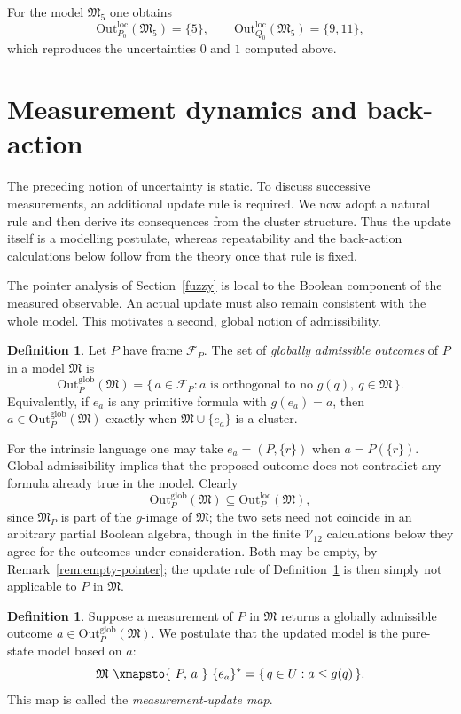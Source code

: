 \documentclass{article}   	%
\theoremstyle{plain}
\theoremstyle{definition}
\newtheorem{definition}[theorem]{Definition}
\theoremstyle{remark}
\newcommand{\Outloc}[2]{\mathrm{Out}^{\mathrm{loc}}_{#1}(#2)}
\newcommand{\Outglob}[2]{\mathrm{Out}^{\mathrm{glob}}_{#1}(#2)}
\begin{document}
For the model $\mathfrak M_5$ one obtains
\[
\Outloc{{P_0}}{\mathfrak M_5}=\{5\},
\qquad
\Outloc{{Q_0}}{\mathfrak M_5}=\{9,11\},
\]
which reproduces the uncertainties $0$ and $1$ computed above.


\section{Measurement dynamics and back-action}
\label{sec:dynamics}

The preceding notion of uncertainty is static.  To discuss successive
measurements, an additional update rule is required.  We now adopt a natural
rule and then derive its consequences from the cluster structure.  Thus the
update itself is a modelling postulate, whereas repeatability and the
back-action calculations below follow from the theory once that rule is fixed.

The pointer analysis of Section~\ref{fuzzy} is local to the Boolean component
of the measured observable.  An actual update must also remain consistent with
the whole model.  This motivates a second, global notion of admissibility.

\begin{definition}
\label{def:global-outcomes}
Let $P$ have frame $\mathcal F_P$.  The set of \emph{globally admissible
outcomes} of $P$ in a model $\mathfrak M$ is
\[
\Outglob{P}{\mathfrak M}
 =\{\,a\in\mathcal F_P:
      a\text{ is orthogonal to no }g(q),\ q\in\mathfrak M\,\}.
\]
Equivalently, if $e_a$ is any primitive formula with $g(e_a)=a$, then
$a\in\Outglob{P}{\mathfrak M}$ exactly when
$\mathfrak M\cup\{e_a\}$ is a cluster.
\end{definition}

For the intrinsic language one may take $e_a=(P,\{r\})$ when
$a=P(\{r\})$.  Global admissibility implies that the proposed outcome does not
contradict any formula already true in the model.  Clearly
\[
\Outglob{P}{\mathfrak M}\subseteq\Outloc{P}{\mathfrak M},
\]
since $\mathfrak M_P$ is part of the $g$-image of $\mathfrak M$; the two sets
need not coincide in an arbitrary partial Boolean algebra, though in the finite
$\mathcal V_{12}$ calculations below they agree for the outcomes under
consideration.  Both may be empty, by Remark~\ref{rem:empty-pointer}; the
update rule of Definition~\ref{def:update} is then simply not applicable to
$P$ in $\mathfrak M$.

\begin{definition}
\label{def:update}
Suppose a measurement of $P$ in $\mathfrak M$ returns a globally admissible
outcome $a\in\Outglob{P}{\mathfrak M}$.  We postulate that
the updated model is the pure-state model based on $a$:
\[
\mathfrak M\ \xmapsto{\ P,\,a\ }\ \{e_a\}^*
 =\{\,q\in U:a\le g(q)\,\}.
\]
This map is called the \emph{measurement-update map}.
\end{definition}
\end{document}
